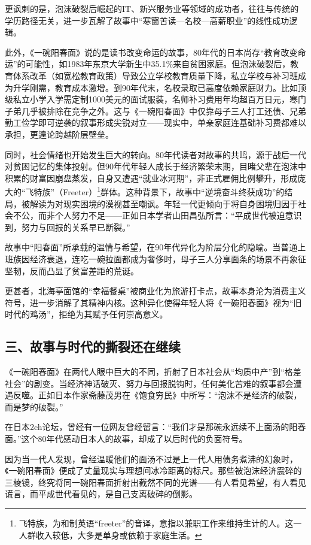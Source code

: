 更讽刺的是，泡沫破裂后崛起的IT、新兴服务业等领域的成功者，往往与传统的学历路径无关，进一步瓦解了故事中“寒窗苦读—名校—高薪职业”的线性成功逻辑。

此外，《一碗阳春面》说的是读书改变命运的故事，80年代的日本尚存“教育改变命运”的可能性，如1983年东京大学新生中35.1\%来自贫困家庭。但泡沫破裂后，教育体系改革（如宽松教育政策）导致公立学校教育质量下降，私立学校与补习班成为升学刚需，教育成本激增。到90年代末，名校录取已高度依赖家庭财力。比如顶级私立小学入学需定制1000美元的面试服装，名师补习费用年均超百万日元，寒门子弟几乎被排除在竞争之外。这与《一碗阳春面》中仅靠母子三人打工还债、兄弟勤工俭学即可逆袭的叙事形成尖锐对立——现实中，单亲家庭连基础补习费都难以承担，更遑论跨越阶层壁垒。

同时，社会情绪也开始发生巨大的转向。80年代读者对故事的共鸣，源于战后一代对贫困记忆的集体投射。但90年代年轻人成长于经济繁荣末期，目睹父辈在泡沫中积累的财富因崩盘蒸发，自身又遭遇“就业冰河期”，非正式雇佣比例攀升，形成庞大的“飞特族”（Freeter）\footnote{飞特族，为和制英语“freeter”的音译，意指以兼职工作来维持生计的人。这一人群收入较低，大多是单身或依赖于家庭生活。}群体。这种背景下，故事中“逆境奋斗终获成功”的结局，被解读为对现实困境的漠视甚至嘲讽。年轻一代更倾向于将自身困境归因于社会不公，而非个人努力不足——正如日本学者山田昌弘所言：“平成世代被迫意识到，努力与回报的关系早已断裂。”

故事中“阳春面”所承载的温情与希望，在90年代异化为阶层分化的隐喻。当普通上班族因经济衰退，连吃一碗拉面都成为奢侈时，母子三人分享面条的场景不再象征坚韧，反而凸显了贫富差距的荒诞。

更甚者，北海亭面馆的“幸福餐桌”被商业化为旅游打卡点，故事本身沦为消费主义符号，进一步消解了其精神内核。这种异化使得年轻人将《一碗阳春面》视为“旧时代的鸡汤”，拒绝为其赋予任何崇高意义。

\subsection{三、故事与时代的撕裂还在继续}

《一碗阳春面》在两代人眼中巨大的不同，折射了日本社会从“均质中产”到“格差社会”的剧变。当经济神话破灭、努力与回报脱钩时，任何美化苦难的叙事都会遭遇反噬。正如日本作家斋藤茂男在《饱食穷民》中所写：“泡沫不是经济的破裂，而是梦的破裂。”

在日本2ch论坛，曾经有一位网友曾经留言：“我们才是那碗永远续不上面汤的阳春面。”这个80年代感动日本人的故事，却成了以后时代的负面符号。

因为当一代人发现，曾经温暖他们的面汤不过是上一代人用债务煮沸的幻象时，《一碗阳春面》便成了丈量现实与理想间冰冷距离的标尺。那些被泡沫经济震碎的三棱镜，终究将同一碗阳春面折射出截然不同的光谱——有人看见希望，有人看见谎言，而平成世代看见的，是自己支离破碎的倒影。
